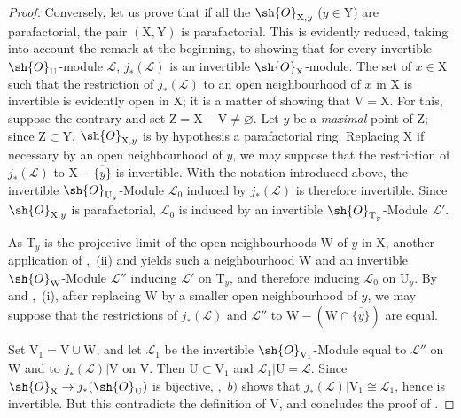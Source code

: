 \begin{proof}
Conversely, let us prove that if all the $\sh{O}_{\mathrm{X},y}$ ($y\in\mathrm{Y}$) are parafactorial, the pair $(\mathrm{X},\mathrm{Y})$ is parafactorial.
This is evidently reduced, taking into account the remark at the beginning, to showing that for every invertible $\sh{O}_{\mathrm{U}}$-module $\mathscr{L}$, $j_*(\mathscr{L})$ is an invertible $\sh{O}_{\mathrm{X}}$-module.
The set of $x\in\mathrm{X}$ such that the restriction of $j_*(\mathscr{L})$ to an open neighbourhood of $x$ in $\mathrm{X}$ is invertible is evidently open in $\mathrm{X}$; it is a matter of showing that $\mathrm{V}=\mathrm{X}$.
For this, suppose the contrary and set $\mathrm{Z}=\mathrm{X}-\mathrm{V}\neq\varnothing$.
Let $y$ be a \emph{maximal} point of $\mathrm{Z}$; since $\mathrm{Z}\subset\mathrm{Y}$, $\sh{O}_{\mathrm{X},y}$ is by hypothesis a parafactorial ring.
Replacing $\mathrm{X}$ if necessary by an open neighbourhood of $y$, we may suppose that the restriction of $j_*(\mathscr{L})$ to $\mathrm{X}-\overline{\{y\}}$ is invertible. With the notation introduced above, the invertible $\sh{O}_{\mathrm{U}_y}$-Module $\mathscr{L}_0$ induced by $j_*(\mathscr{L})$ is therefore invertible. Since $\sh{O}_{\mathrm{X},y}$ is parafactorial, $\mathscr{L}_0$ is induced by an invertible $\sh{O}_{\mathrm{T}_y}$-Module $\mathscr{L}'$.

As $\mathrm{T}_y$ is the projective limit of the open neighbourhoods $\mathrm{W}$ of $y$ in $\mathrm{X}$, another application of ,~(ii) and  yields such a neighbourhood $\mathrm{W}$ and an invertible $\sh{O}_{\mathrm{W}}$-Module $\mathscr{L}''$ inducing $\mathscr{L}'$ on $\mathrm{T}_y$, and therefore inducing $\mathscr{L}_0$ on $\mathrm{U}_y$. By  and ,~(i), after replacing $\mathrm{W}$ by a smaller open neighbourhood of $y$, we may suppose that the restrictions of $j_*(\mathscr{L})$ and $\mathscr{L}''$ to $\mathrm{W}-(\mathrm{W}\cap\overline{\{y\}})$ are equal.

Set $\mathrm{V}_1=\mathrm{V}\cup\mathrm{W}$, and let $\mathscr{L}_1$ be the invertible $\sh{O}_{\mathrm{V}_1}$-Module equal to $\mathscr{L}''$ on $\mathrm{W}$ and to $j_*(\mathscr{L})|\mathrm{V}$ on $\mathrm{V}$. Then $\mathrm{U}\subset\mathrm{V}_1$ and $\mathscr{L}_1|\mathrm{U}=\mathscr{L}$. Since $\sh{O}_{\mathrm{X}}\to j_*(\sh{O}_{\mathrm{U}})$ is bijective, ,~$b)$ shows that $j_*(\mathscr{L})|\mathrm{V}_1\cong\mathscr{L}_1$, hence is invertible.
But this contradicts the definition of $\mathrm{V}$, and concludes the proof of .
\end{proof}

